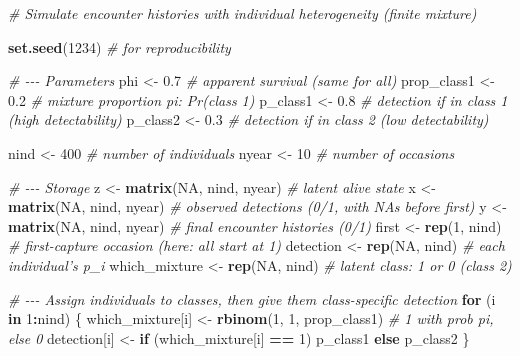 \documentclass[
  12pt,
]{krantz}
\newenvironment{Shaded}{\begin{snugshade}}{\end{snugshade}}
\newcommand{\CommentTok}[1]{\textcolor[rgb]{0.56,0.35,0.01}{\textit{#1}}}
\newcommand{\ConstantTok}[1]{\textcolor[rgb]{0.56,0.35,0.01}{#1}}
\newcommand{\ControlFlowTok}[1]{\textcolor[rgb]{0.13,0.29,0.53}{\textbf{#1}}}
\newcommand{\DecValTok}[1]{\textcolor[rgb]{0.00,0.00,0.81}{#1}}
\newcommand{\FloatTok}[1]{\textcolor[rgb]{0.00,0.00,0.81}{#1}}
\newcommand{\FunctionTok}[1]{\textcolor[rgb]{0.13,0.29,0.53}{\textbf{#1}}}
\newcommand{\NormalTok}[1]{#1}
\newcommand{\OtherTok}[1]{\textcolor[rgb]{0.56,0.35,0.01}{#1}}
\newcommand{\SpecialCharTok}[1]{\textcolor[rgb]{0.81,0.36,0.00}{\textbf{#1}}}
\begin{document}
\begin{Shaded}
\begin{Highlighting}[]
\CommentTok{\# Simulate encounter histories with individual heterogeneity (finite mixture)}

\FunctionTok{set.seed}\NormalTok{(}\DecValTok{1234}\NormalTok{)           }\CommentTok{\# for reproducibility}

\CommentTok{\# {-}{-}{-} Parameters}
\NormalTok{phi }\OtherTok{\textless{}{-}} \FloatTok{0.7}               \CommentTok{\# apparent survival (same for all)}
\NormalTok{prop\_class1 }\OtherTok{\textless{}{-}} \FloatTok{0.2}       \CommentTok{\# mixture proportion pi: Pr(class 1)}
\NormalTok{p\_class1 }\OtherTok{\textless{}{-}} \FloatTok{0.8}          \CommentTok{\# detection if in class 1 (high detectability)}
\NormalTok{p\_class2 }\OtherTok{\textless{}{-}} \FloatTok{0.3}          \CommentTok{\# detection if in class 2 (low detectability)}

\NormalTok{nind }\OtherTok{\textless{}{-}} \DecValTok{400}              \CommentTok{\# number of individuals}
\NormalTok{nyear }\OtherTok{\textless{}{-}} \DecValTok{10}              \CommentTok{\# number of occasions}

\CommentTok{\# {-}{-}{-} Storage}
\NormalTok{z }\OtherTok{\textless{}{-}} \FunctionTok{matrix}\NormalTok{(}\ConstantTok{NA}\NormalTok{, nind, nyear)    }\CommentTok{\# latent alive state}
\NormalTok{x }\OtherTok{\textless{}{-}} \FunctionTok{matrix}\NormalTok{(}\ConstantTok{NA}\NormalTok{, nind, nyear)    }\CommentTok{\# observed detections (0/1, with NAs before first)}
\NormalTok{y }\OtherTok{\textless{}{-}} \FunctionTok{matrix}\NormalTok{(}\ConstantTok{NA}\NormalTok{, nind, nyear)    }\CommentTok{\# final encounter histories (0/1)}
\NormalTok{first }\OtherTok{\textless{}{-}} \FunctionTok{rep}\NormalTok{(}\DecValTok{1}\NormalTok{, nind)           }\CommentTok{\# first{-}capture occasion (here: all start at 1)}
\NormalTok{detection }\OtherTok{\textless{}{-}} \FunctionTok{rep}\NormalTok{(}\ConstantTok{NA}\NormalTok{, nind)      }\CommentTok{\# each individual’s p\_i}
\NormalTok{which\_mixture }\OtherTok{\textless{}{-}} \FunctionTok{rep}\NormalTok{(}\ConstantTok{NA}\NormalTok{, nind)  }\CommentTok{\# latent class: 1 or 0 (class 2)}

\CommentTok{\# {-}{-}{-} Assign individuals to classes, then give them class{-}specific detection}
\ControlFlowTok{for}\NormalTok{ (i }\ControlFlowTok{in} \DecValTok{1}\SpecialCharTok{:}\NormalTok{nind) \{}
\NormalTok{  which\_mixture[i] }\OtherTok{\textless{}{-}} \FunctionTok{rbinom}\NormalTok{(}\DecValTok{1}\NormalTok{, }\DecValTok{1}\NormalTok{, prop\_class1) }\CommentTok{\# 1 with prob pi, else 0}
\NormalTok{  detection[i] }\OtherTok{\textless{}{-}} \ControlFlowTok{if}\NormalTok{ (which\_mixture[i] }\SpecialCharTok{==} \DecValTok{1}\NormalTok{) p\_class1 }\ControlFlowTok{else}\NormalTok{ p\_class2}
\NormalTok{\}}


\end{Highlighting}
\end{Shaded}
\end{document}
